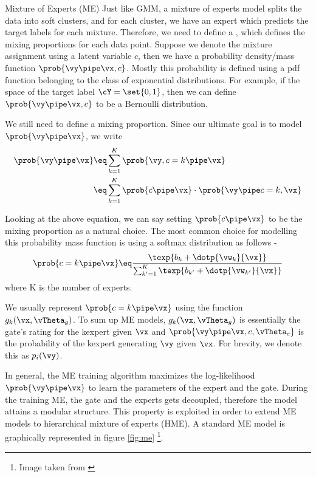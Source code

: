 \documentclass{article}
\begin{document}
\begin{psection}{Mixture of Experts (ME)}
	Just like GMM, a mixture of experts model splits the data into soft clusters, and for each cluster, we have an expert which predicts the target labels for each mixture. Therefore, we need to define a , which defines the mixing proportions for each data point. Suppose we denote the mixture assignment using a latent variable $c$, then we have a probability density/mass function $\prob{\vy \pipe \vx, c}$. Mostly this probability is defined using a pdf function belonging to the class of exponential distributions. For example, if the space of the target label $\cY = \set{0, 1}$, then we can define $\prob{\vy \pipe \vx, c}$ to be a Bernoulli distribution.

	We still need to define a mixing proportion. Since our ultimate goal is to model $\prob{\vy \pipe \vx}$, we write
	\begin{align*}
		\prob{\vy \pipe \vx} &\eq \sum_{k = 1}^K \prob{\vy, c = k \pipe \vx} \\
		&\eq \sum_{k = 1}^K \prob{c \pipe \vx} \cdot \prob{\vy \pipe c = k, \vx}
	\end{align*}

	Looking at the above equation, we can say setting $\prob{c \pipe \vx}$ to be the mixing proportion as a natural choice. The most common choice for modelling this probability mass function is using a softmax distribution as follows -
	\begin{align*}
		\prob{c = k \pipe \vx} \eq \frac{\texp{b_k + \dotp{\vw_k}{\vx}}}{\sum_{k' = 1}^K \texp{b_{k'} + \dotp{\vw_{k'}}{\vx}}}
	\end{align*}
	where K is the number of experts.

	We usually represent $\prob{c = k \pipe \vx}$ using the function $g_k(\vx, \vTheta_g)$. To sum up ME models, $g_k(\vx, \vTheta_g)$ is essentially the gate's rating for the k\tth expert given $\vx$ and $\prob{\vy \pipe \vx, c, \vTheta_e}$ is the probability of the k\tth expert generating $\vy$ given $\vx$. For brevity, we denote this as $p_i(\vy)$.

	In general, the ME training algorithm maximizes the log-likelihood $\prob{\vy \pipe \vx}$ to learn the parameters of the expert and the gate. During the training ME, the gate and the experts gets decoupled, therefore the model attains a modular structure. This property is exploited in order to extend ME models to hierarchical mixture of experts (HME). A standard ME model is graphically represented in figure \ref{fig:me} \footnote{Image taken from \cite{me-image}}.


\end{psection}
\end{document}
